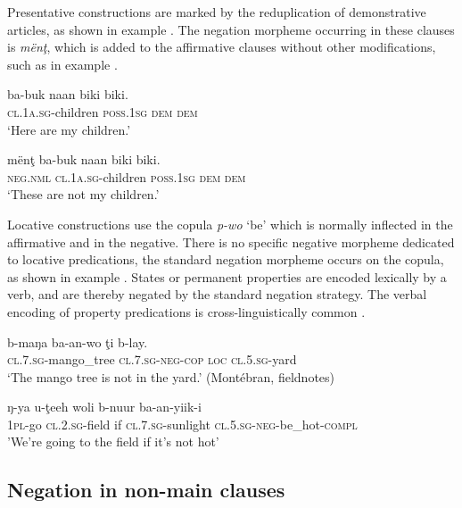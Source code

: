 \documentclass[output=paper,colorlinks,citecolor=brown]{langscibook}
\begin{document}
Presentative constructions are marked by the reduplication of demonstrative articles, as shown in example . The negation morpheme occurring in these clauses is \textit{mënţ}, which is added to the affirmative clauses without other modifications, such as in example .

\ea\label{ex:mank:48}
    \gll ba-buk naan biki biki.\\
         \textsc{cl.1a.sg}-children \textsc{poss.1sg} \textsc{dem} \textsc{dem}\\
    \glt ‘Here are my children.’ \citep[124]{Gaved2020}
\z

\ea\label{ex:mank:49}
    \gll mënţ ba{}-buk naan biki biki. \\
         \textsc{neg.nml} \textsc{cl.1a.sg}-children \textsc{poss.1sg} \textsc{dem} \textsc{dem} \\
    \glt ‘These are not my children.’ \citep[126]{Gaved2020}
\z

Locative constructions use the copula \textit{p-wo} ‘be’ which is normally inflected in the affirmative and in the negative. There is no specific negative morpheme dedicated to  locative predications, the standard negation morpheme occurs on the copula, as shown in example .
States or permanent properties are encoded lexically by a verb, and are thereby negated by the standard negation strategy. The verbal encoding of property predications is cross-linguistically common .

\ea\label{ex:mank:50}
    \gll b-maŋa ba{}-an-wo ţi b-lay. \\
         \textsc{cl.7.sg}-mango\_tree \textsc{cl.7.sg{}-neg-cop} \textsc{loc} \textsc{cl.5.sg}-yard\\
    \glt ‘The mango tree is not in the yard.’ (Montébran, fieldnotes)
\z

\ea\label{ex:mank:add1}
\gll ŋ-ya u-ţeeh woli b-nuur ba-an-yiik-i \\
    1\textsc{pl}-go \textsc{cl.2.sg}-field if \textsc{cl.7.sg}-sunlight \textsc{cl.5.sg-neg}-be\_hot-\textsc{compl}\\ 
\glt 'We're going to the field if it's not hot' \citep[121]{Gaved2020} \\
\z

\subsection{Negation in non-main clauses}\label{sec:mank:2.4}
\end{document}
